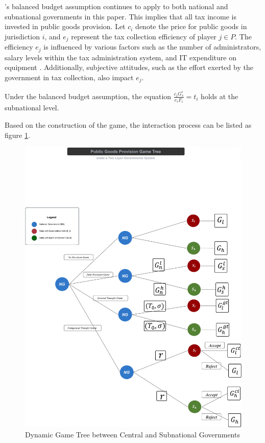\documentclass[man]{apa7}
\begin{document}
\Textcite{volden2007intergovernmental}'s balanced budget assumption continues to apply to both national and subnational governments in this paper. This implies that all tax income is invested in public goods provision. Let $c_i$ denote the price for public goods in jurisdiction $i$, and $e_j$ represent the tax collection efficiency of player $j \in P$. The efficiency $e_j$ is influenced by various factors such as the number of administrators, salary levels within the tax administration system, and IT expenditure on equipment \parencite{savic2015impact, kiser1994could, aizenman2008collection, mattos2011flypaper}. Additionally, subjective attitudes, such as the effort exerted by the government in tax collection, also impact $e_j$.

Under the balanced budget assumption, the equation $\frac{c_i G_s^i}{e_i F_i}=t_i$ holds at the subnational level.\label{priceandeffort}

Based on the construction of the game, the interaction process can be listed as figure \ref{dynamicgamenoutility}.

\newpage
\begin{figure}[H]
  \centering
  \includegraphics[scale=0.045]{Figures/tree.jpg}
  \caption[Dynamic Game Tree of 3 players]{Dynamic Game Tree between Central and Subnational Governments
    \texttt{} }
  \label{dynamicgamenoutility}
\end{figure}
\newpage
\end{document}
